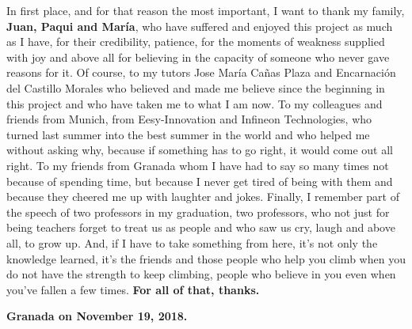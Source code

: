        \vspace{1cm}

In first place, and for that reason the most important, I want to thank my family, {\bf Juan, Paqui and María}, who have suffered and enjoyed this project as much as I have, for their credibility, patience, for the moments of weakness supplied with joy and above all for believing in the capacity of someone who never gave reasons for it.\newline
Of course, to my tutors Jose María Cañas Plaza and Encarnación del Castillo Morales who believed and made me believe since the beginning in this project and who have taken me to what I am now. \newline
To my colleagues and friends from Munich, from Eesy-Innovation and Infineon Technologies, who turned last summer into the best summer in the world and who helped me without asking why, because if something has to go right, it would come out all right.\newline
To my friends from Granada whom I have had to say so many times not because of spending time, but because I never get tired of being with them and because they cheered me up with laughter and jokes.\newline
Finally, I remember part of the speech of two professors in my graduation, two professors, who not just for being teachers forget to treat us as people and who saw us cry, laugh and above all, to grow up. And, if I have to take something from here, it's not only the knowledge learned, it's the friends and those people who help you climb when you do not have the strength to keep climbing, people who believe in you even when you've fallen a few times. \newline
{\bf For all of that, thanks.}

\vspace{1cm}

{\bf Granada on November 19, 2018.}

